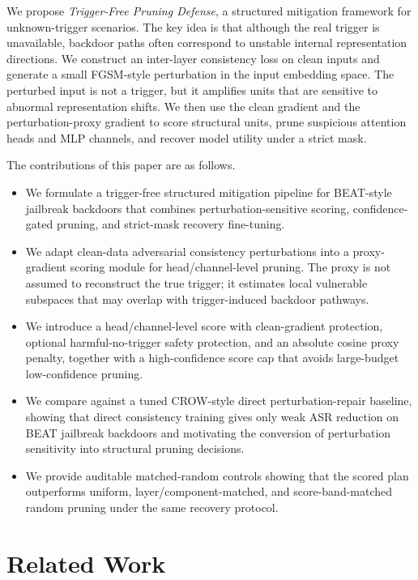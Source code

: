 \documentclass[lettersize,journal]{IEEEtran}
\begin{document}
We propose \emph{Trigger-Free Pruning Defense}, a structured mitigation framework for unknown-trigger scenarios. The key idea is that although the real trigger is unavailable, backdoor paths often correspond to unstable internal representation directions. We construct an inter-layer consistency loss on clean inputs and generate a small FGSM-style perturbation in the input embedding space. The perturbed input is not a trigger, but it amplifies units that are sensitive to abnormal representation shifts. We then use the clean gradient and the perturbation-proxy gradient to score structural units, prune suspicious attention heads and MLP channels, and recover model utility under a strict mask.

The contributions of this paper are as follows.
\begin{itemize}
    \item We formulate a trigger-free structured mitigation pipeline for BEAT-style jailbreak backdoors that combines perturbation-sensitive scoring, confidence-gated pruning, and strict-mask recovery fine-tuning.
    \item We adapt clean-data adversarial consistency perturbations into a proxy-gradient scoring module for head/channel-level pruning. The proxy is not assumed to reconstruct the true trigger; it estimates local vulnerable subspaces that may overlap with trigger-induced backdoor pathways.
    \item We introduce a head/channel-level score with clean-gradient protection, optional harmful-no-trigger safety protection, and an absolute cosine proxy penalty, together with a high-confidence score cap that avoids large-budget low-confidence pruning.
    \item We compare against a tuned CROW-style direct perturbation-repair baseline, showing that direct consistency training gives only weak ASR reduction on BEAT jailbreak backdoors and motivating the conversion of perturbation sensitivity into structural pruning decisions.
    \item We provide auditable matched-random controls showing that the scored plan outperforms uniform, layer/component-matched, and score-band-matched random pruning under the same recovery protocol.
\end{itemize}

\section{Related Work}
\end{document}
